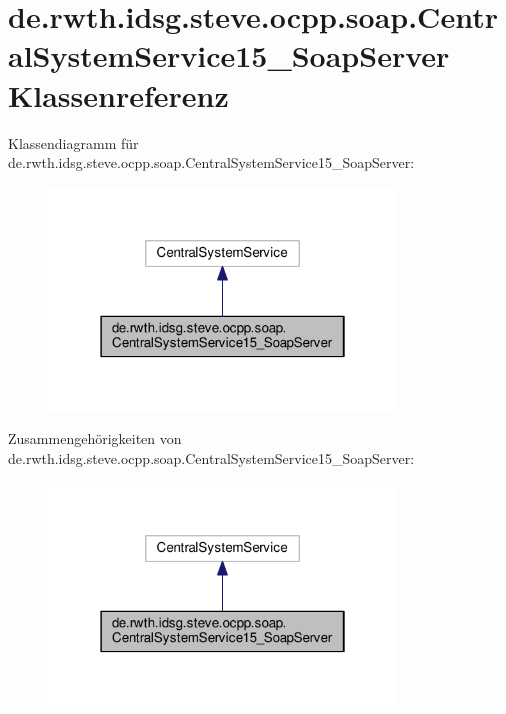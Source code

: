 \hypertarget{classde_1_1rwth_1_1idsg_1_1steve_1_1ocpp_1_1soap_1_1_central_system_service15___soap_server}{\section{de.\-rwth.\-idsg.\-steve.\-ocpp.\-soap.\-Central\-System\-Service15\-\_\-\-Soap\-Server Klassenreferenz}
\label{classde_1_1rwth_1_1idsg_1_1steve_1_1ocpp_1_1soap_1_1_central_system_service15___soap_server}
}


Klassendiagramm für de.\-rwth.\-idsg.\-steve.\-ocpp.\-soap.\-Central\-System\-Service15\-\_\-\-Soap\-Server\-:\nopagebreak
\begin{figure}[H]
\begin{center}
\leavevmode
\includegraphics[width=262pt]{classde_1_1rwth_1_1idsg_1_1steve_1_1ocpp_1_1soap_1_1_central_system_service15___soap_server__inherit__graph}
\end{center}
\end{figure}


Zusammengehörigkeiten von de.\-rwth.\-idsg.\-steve.\-ocpp.\-soap.\-Central\-System\-Service15\-\_\-\-Soap\-Server\-:\nopagebreak
\begin{figure}[H]
\begin{center}
\leavevmode
\includegraphics[width=262pt]{classde_1_1rwth_1_1idsg_1_1steve_1_1ocpp_1_1soap_1_1_central_system_service15___soap_server__coll__graph}
\end{center}
\end{figure}
